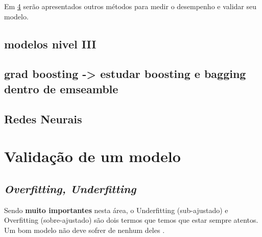 \documentclass[
]{book}
\begin{document}
Em \ref{valid} serão apresentados outros métodos para medir o desempenho e validar seu modelo.

\hypertarget{modelos-nivel-iii}{%
\section{modelos nivel III}\label{modelos-nivel-iii}}

\hypertarget{grad-boosting---estudar-boosting-e-bagging-dentro-de-emseamble}{%
\section{grad boosting -\textgreater{} estudar boosting e bagging dentro de emseamble}\label{grad-boosting---estudar-boosting-e-bagging-dentro-de-emseamble}}

\hypertarget{redes-neurais}{%
\section{Redes Neurais}\label{redes-neurais}}

\hypertarget{valid}{%
\chapter{Validação de um modelo}\label{valid}}

\hypertarget{fitt}{%
\section{\texorpdfstring{\emph{Overfitting, Underfitting}}{Overfitting, Underfitting}}\label{fitt}}

Sendo \textbf{muito importantes} nesta área, o Underfitting (sub-ajustado) e Overfitting (sobre-ajustado) são dois termos que temos que estar sempre atentos. Um bom modelo não deve sofrer de nenhum deles \citep{silver2013sinal}.
\end{document}
